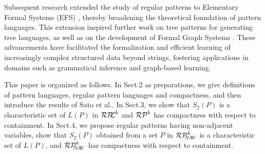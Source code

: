 %
%
Subsequent research extended the study of regular patterns to Elementary Formal Systems (EFS) \cite{Arikawa1992}, thereby broadening the theoretical foundation of pattern languages. This extension inspired further work on tree patterns \cite{Arimura1997,Suzuki2006} for generating tree languages, as well as on the development of Formal Graph Systems \cite{Uchida1994}. These advancements have facilitated the formalization and efficient learning of increasingly complex structured data beyond strings, fostering applications in domains such as grammatical inference and graph-based learning.
%

This paper is organized as follows.
In Sect.2 as preparations, we give definitions of pattern languages, regular pattern languages and compactness, and then introduce the results of Sato et al.\cite{Sato1}.
In Sect.3, we show that $S_{2}(P)$ is a characteristic set of $L(P)$ in $\mathcal{RP\!\!L}^{k}$ and $\mathcal{RP}^{k}$ has compactness with respect to containment.
In Sect.4, we propose regular patterns having non-adjacent variables, show that $S_2(P)$ obtained from a set $P$ in $\mathcal{RP}^{k}_{\!\!\!N\!A\!V}$ is a characteristic set of $L(P)$, and $\mathcal{RP}^{k}_{\!\!\!N\!A\!V}$ has compactness with respect to containment.

